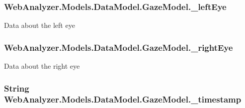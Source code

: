 \subsubsection[{\+\_\+left\+Eye}]{ Web\+Analyzer.\+Models.\+Data\+Model.\+Gaze\+Model.\+\_\+left\+Eye\hspace{0.3cm}{\ttfamily [private]}}\label{class_web_analyzer_1_1_models_1_1_data_model_1_1_gaze_model_a95213ed60e16c99277c83349acbba88d}


Data about the left eye 

\hypertarget{class_web_analyzer_1_1_models_1_1_data_model_1_1_gaze_model_ac5b10c7779e4a0e426aba35246991cf9}{}
\subsubsection[{\+\_\+right\+Eye}]{ Web\+Analyzer.\+Models.\+Data\+Model.\+Gaze\+Model.\+\_\+right\+Eye\hspace{0.3cm}{\ttfamily [private]}}\label{class_web_analyzer_1_1_models_1_1_data_model_1_1_gaze_model_ac5b10c7779e4a0e426aba35246991cf9}


Data about the right eye 

\hypertarget{class_web_analyzer_1_1_models_1_1_data_model_1_1_gaze_model_a313637ceeff4c9c9bc46c03d9c2b7278}{}
\subsubsection[{\+\_\+timestamp}]{\setlength{\rightskip}{0pt plus 5cm}String Web\+Analyzer.\+Models.\+Data\+Model.\+Gaze\+Model.\+\_\+timestamp\hspace{0.3cm}{\ttfamily [private]}}\label{class_web_analyzer_1_1_models_1_1_data_model_1_1_gaze_model_a313637ceeff4c9c9bc46c03d9c2b7278}


